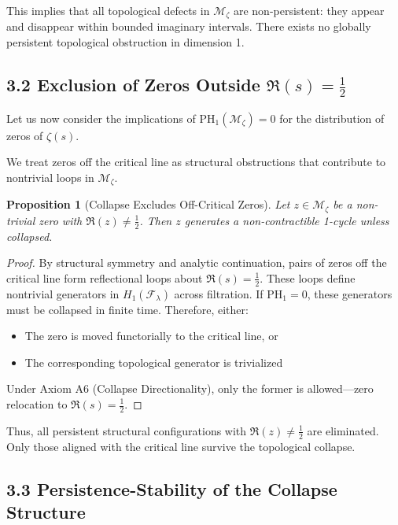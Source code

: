 \documentclass[11pt]{article}
\newtheorem{proposition}[theorem]{Proposition}
\begin{document}
This implies that all topological defects in $\mathcal{M}_\zeta$ are non-persistent: they appear and disappear within bounded imaginary intervals.  
There exists no globally persistent topological obstruction in dimension 1.

\subsection{3.2 Exclusion of Zeros Outside $\Re(s) = \tfrac{1}{2}$}

Let us now consider the implications of $\mathrm{PH}_1(\mathcal{M}_\zeta) = 0$ for the distribution of zeros of $\zeta(s)$.

We treat zeros off the critical line as structural obstructions that contribute to nontrivial loops in $\mathcal{M}_\zeta$.

\begin{proposition}[Collapse Excludes Off-Critical Zeros]
Let $z \in \mathcal{M}_\zeta$ be a non-trivial zero with $\Re(z) \ne \tfrac{1}{2}$. Then $z$ generates a non-contractible 1-cycle unless collapsed.
\end{proposition}

\begin{proof}
By structural symmetry and analytic continuation, pairs of zeros off the critical line form reflectional loops about $\Re(s) = \tfrac{1}{2}$.  
These loops define nontrivial generators in $H_1(\mathcal{F}_\lambda)$ across filtration.  
If $\mathrm{PH}_1 = 0$, these generators must be collapsed in finite time. Therefore, either:

\begin{itemize}
    \item The zero is moved functorially to the critical line, or
    \item The corresponding topological generator is trivialized
\end{itemize}

Under Axiom A6 (Collapse Directionality), only the former is allowed—zero relocation to $\Re(s) = \tfrac{1}{2}$.
\end{proof}

Thus, all persistent structural configurations with $\Re(z) \ne \tfrac{1}{2}$ are eliminated.  
Only those aligned with the critical line survive the topological collapse.

\subsection{3.3 Persistence-Stability of the Collapse Structure}
\end{document}
